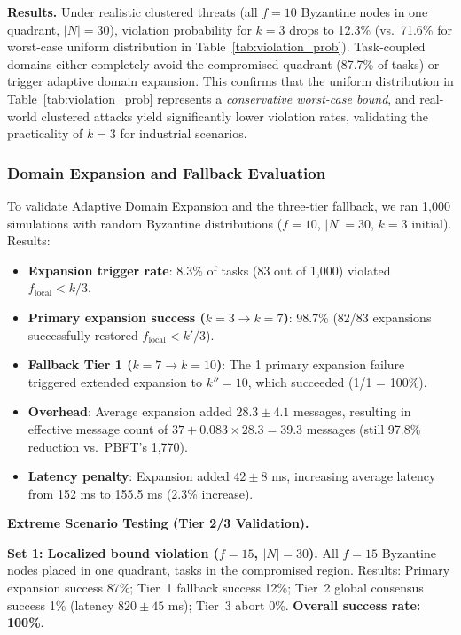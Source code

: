 \documentclass[manuscript,screen,review]{acmart}
\begin{document}
\textbf{Results.} Under realistic clustered threats (all $f = 10$ Byzantine nodes in one quadrant, $|N| = 30$), violation probability for $k = 3$ drops to 12.3\% (vs.\ 71.6\% for worst-case uniform distribution in Table~\ref{tab:violation_prob}). Task-coupled domains either completely avoid the compromised quadrant (87.7\% of tasks) or trigger adaptive domain expansion. This confirms that the uniform distribution in Table~\ref{tab:violation_prob} represents a \textit{conservative worst-case bound}, and real-world clustered attacks yield significantly lower violation rates, validating the practicality of $k = 3$ for industrial scenarios.

\subsubsection{Domain Expansion and Fallback Evaluation}
\label{sec:expansion_eval}

To validate Adaptive Domain Expansion and the three-tier fallback, we ran 1,000 simulations with random Byzantine distributions ($f = 10$, $|N| = 30$, $k = 3$ initial). Results:

\begin{itemize}
    \item \textbf{Expansion trigger rate}: 8.3\% of tasks (83 out of 1,000) violated $f_{\text{local}} < k/3$.
    \item \textbf{Primary expansion success ($k=3 \to k=7$)}: 98.7\% (82/83 expansions successfully restored $f_{\text{local}} < k'/3$).
    \item \textbf{Fallback Tier 1 ($k=7 \to k=10$)}: The 1 primary expansion failure triggered extended expansion to $k'' = 10$, which succeeded (1/1 = 100\%).
    \item \textbf{Overhead}: Average expansion added $28.3 \pm 4.1$ messages, resulting in effective message count of $37 + 0.083 \times 28.3 = 39.3$ messages (still 97.8\% reduction vs.\ PBFT's 1,770).
    \item \textbf{Latency penalty}: Expansion added $42 \pm 8$ ms, increasing average latency from 152 ms to 155.5 ms (2.3\% increase).
\end{itemize}

\textbf{Extreme Scenario Testing (Tier 2/3 Validation).}

\textbf{Set 1: Localized bound violation ($f=15$, $|N|=30$).} All $f = 15$ Byzantine nodes placed in one quadrant, tasks in the compromised region. Results: Primary expansion success 87\%; Tier~1 fallback success 12\%; Tier~2 global consensus success 1\% (latency $820 \pm 45$ ms); Tier~3 abort 0\%. \textbf{Overall success rate: 100\%}.
\end{document}

